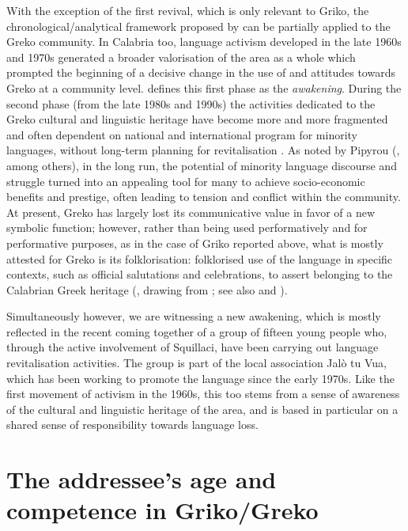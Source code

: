 \documentclass[output=paper,hidelinks]{langscibook}
\begin{document}
With the exception of the first revival, which is only relevant to Griko, the chronological/analytical framework proposed by \citet{Pellegrino2013} can be partially applied to the Greko community. In Calabria too, language activism developed in the late 1960s and 1970s generated a broader valorisation of the area as a whole which prompted the beginning of a decisive change in the use of and attitudes towards Greko at a community level. \citet{Martino1980} defines this first phase as the \textit{awakening}. During the second phase (from the late 1980s and 1990s) the activities dedicated to the Greko cultural and linguistic heritage have become more and more fragmented and often dependent on national and international program for minority languages, without long-term planning for revitalisation \citep{Martino2009}. As noted by Pipyrou (\citeyear{Pipyrou2016}, among others), in the long run, the potential of minority language discourse and struggle turned into an appealing tool for many to achieve socio-economic benefits and prestige, often leading to tension and conflict within the community. At present, Greko has largely lost its communicative value in favor of a new symbolic function; however, rather than being used performatively and for performative purposes, as in the case of Griko reported above, what is mostly attested for Greko is its folklorisation: folklorised use of the language in specific contexts, such as official salutations and celebrations, to assert belonging to the Calabrian Greek heritage (\cite{Squillaci-inprep}, drawing from \citealt{fishman1991}; see also \citealt{Martino2009} and \citealt{Pipyrou2016}). 



Simultaneously however, we are witnessing a new awakening, which is mostly reflected in the recent coming together of a group of fifteen young people who, through the active involvement of Squillaci, have been carrying out language revitalisation activities. The group is part of the local association Jalò tu Vua, which has been working to promote the language since the early 1970s. Like the first movement of activism in the 1960s, this too stems from a sense of awareness of the cultural and linguistic heritage of the area, and is based in particular on a shared sense of responsibility towards language loss.



\section{The addressee’s age and competence in Griko/Greko}
\label{sec:key:3}
\end{document}
